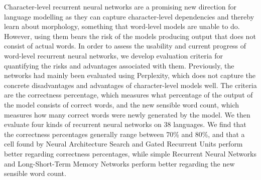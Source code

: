 \documentclass[11pt,a4paper,twoside,openright]{scrbook}
\begin{document}
\deckblatt

\pagestyle{scrheadings}

\erklaerung

\thispagestyle{scrplain}
\noindent
Character-level recurrent neural networks are a promising new direction for language modelling as they can capture character-level dependencies and thereby learn about morphology, something that word-level models are unable to do. However, using them bears the risk of the models producing output that does not consist of actual words. In order to assess the usability and current progress of word-level recurrent neural networks, we develop evaluation criteria for quantifying the risks and advantages associated with them. Previously, the networks had mainly been evaluated using Perplexity, which does not capture the concrete disadvantages and advantages of character-level models well. The criteria are the correctness percentage, which measures what percentage of the output of the model consists of correct words, and the new sensible word count, which measures how many correct words were newly generated by the model. We then evaluate four kinds of recurrent neural networks on 38 languages. We find that the correctness percentages generally range between 70\% and 80\%, and that a cell found by Neural Architecture Search and Gated Recurrent Units perform better regarding correctness percentages, while simple Recurrent Neural Networks and Long-Short-Term Memory Networks perform better regarding the new sensible word count. 


\tableofcontents

\end{document}
